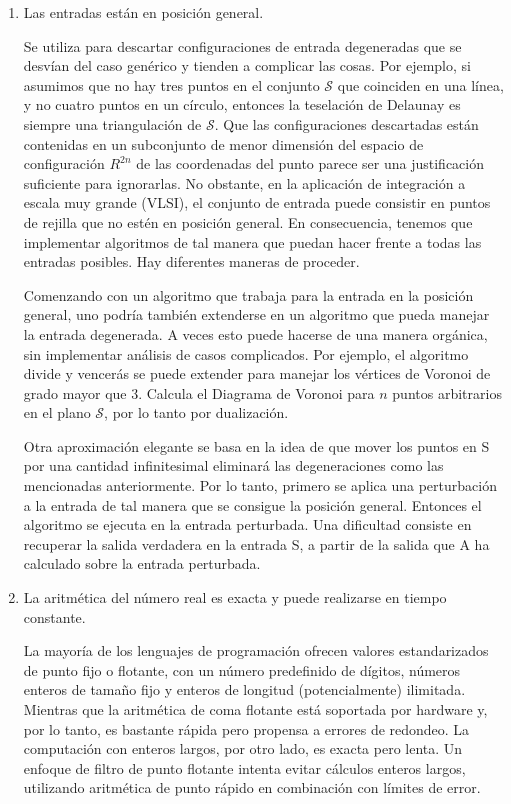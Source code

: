 \begin{enumerate}
    \item Las entradas están en posición general.
    
        Se utiliza para descartar configuraciones de entrada degeneradas que se desvían del caso genérico y tienden a complicar las cosas. Por ejemplo, si asumimos que no hay tres puntos en el conjunto $\mathcal{S}$ que coinciden en una línea, y no cuatro puntos en un círculo, entonces la teselación de Delaunay es siempre una triangulación de $\mathcal{S}$. Que las configuraciones descartadas están contenidas en un subconjunto de menor dimensión del espacio de configuración $R^{2n}$ de las coordenadas del punto parece ser una justificación suficiente para ignorarlas. No obstante, en la aplicación de integración a escala muy grande (VLSI), el conjunto de entrada puede consistir en puntos de rejilla que no estén en posición general. En consecuencia, tenemos que implementar algoritmos de tal manera que puedan hacer frente a todas las entradas posibles. Hay diferentes maneras de proceder.
        \vspace{0.3cm}
        
        Comenzando con un algoritmo que trabaja para la entrada en la posición general, uno podría también extenderse en un algoritmo que pueda manejar la entrada degenerada. A veces esto puede hacerse de una manera orgánica, sin implementar análisis de casos complicados. Por ejemplo, el algoritmo divide y vencerás se puede extender para manejar los vértices de Voronoi de grado mayor que 3. Calcula el Diagrama de Voronoi para $n$ puntos arbitrarios en el plano $\mathcal{S}$, por lo tanto por dualización.
        \vspace{0.3cm}
        
        Otra aproximación elegante se basa en la idea de que mover los puntos en S por una cantidad infinitesimal eliminará las degeneraciones como las mencionadas anteriormente. Por lo tanto, primero se aplica una perturbación a la entrada de tal manera que se consigue la posición general. Entonces el algoritmo se ejecuta en la entrada perturbada. Una dificultad consiste en recuperar la salida verdadera en la entrada S, a partir de la salida que A ha calculado sobre la entrada perturbada.


    \item La aritmética del número real es exacta y puede realizarse en tiempo constante.
    
        La mayoría de los lenguajes de programación ofrecen valores estandarizados de punto fijo o flotante, con un número predefinido de dígitos, números enteros de tamaño fijo y enteros de longitud (potencialmente) ilimitada. Mientras que la aritmética de coma flotante está soportada por hardware y, por lo tanto, es bastante rápida pero propensa a errores de redondeo. La computación con enteros largos, por otro lado, es exacta pero lenta. Un enfoque de filtro de punto flotante intenta evitar cálculos enteros largos, utilizando aritmética de punto rápido en combinación con límites de error.
        \vspace{0.3cm}
        

\end{enumerate}
